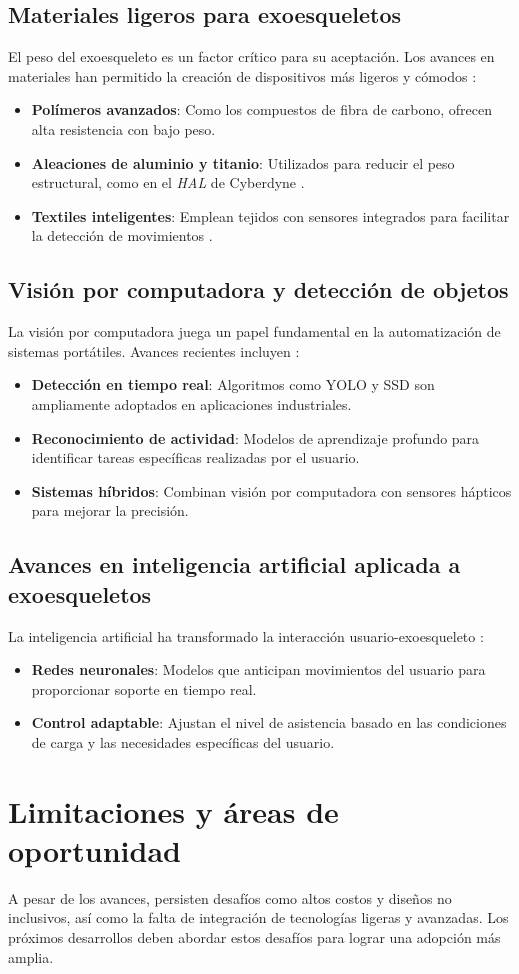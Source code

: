 \subsection{Materiales ligeros para exoesqueletos}
El peso del exoesqueleto es un factor crítico para su aceptación. Los avances en materiales han permitido la creación de dispositivos más ligeros y cómodos \cite{park2019lightweight, nguyen2020visionrobotics}:
\begin{itemize}
    \item \textbf{Polímeros avanzados}: Como los compuestos de fibra de carbono, ofrecen alta resistencia con bajo peso.
    \item \textbf{Aleaciones de aluminio y titanio}: Utilizados para reducir el peso estructural, como en el \textit{HAL} de Cyberdyne \cite{choi2020carbonfiber}.
    \item \textbf{Textiles inteligentes}: Emplean tejidos con sensores integrados para facilitar la detección de movimientos \cite{nguyen2020visionrobotics}.
\end{itemize}

\subsection{Visión por computadora y detección de objetos}
La visión por computadora juega un papel fundamental en la automatización de sistemas portátiles. Avances recientes incluyen \cite{redmon2018yolo, patel2021tooldetection}:
\begin{itemize}
    \item \textbf{Detección en tiempo real}: Algoritmos como YOLO y SSD son ampliamente adoptados en aplicaciones industriales.
    \item \textbf{Reconocimiento de actividad}: Modelos de aprendizaje profundo para identificar tareas específicas realizadas por el usuario.
    \item \textbf{Sistemas híbridos}: Combinan visión por computadora con sensores hápticos para mejorar la precisión.
\end{itemize}

\subsection{Avances en inteligencia artificial aplicada a exoesqueletos}
La inteligencia artificial ha transformado la interacción usuario-exoesqueleto \cite{liu2021costanalysis, garcia2020integratedai}:
\begin{itemize}
    \item \textbf{Redes neuronales}: Modelos que anticipan movimientos del usuario para proporcionar soporte en tiempo real.
    \item \textbf{Control adaptable}: Ajustan el nivel de asistencia basado en las condiciones de carga y las necesidades específicas del usuario.
\end{itemize}

\section{Limitaciones y áreas de oportunidad}
A pesar de los avances, persisten desafíos como altos costos y diseños no inclusivos, así como la falta de integración de tecnologías ligeras y avanzadas. Los próximos desarrollos deben abordar estos desafíos para lograr una adopción más amplia.